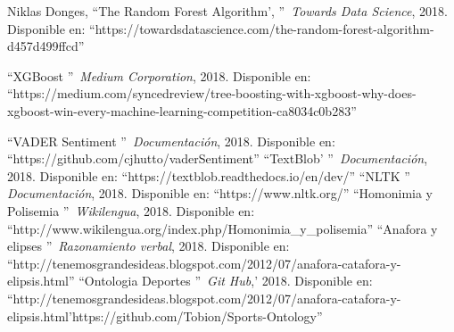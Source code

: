 \documentclass[../all.tex]{subfiles}
\begin{document}
\begin{thebibliography}{37}
			Niklas Donges, 
			\textquotedblleft The Random Forest Algorithm',
			\textquotedblright\ \textit{Towards Data Science},
			2018.
			Disponible en: ``https://towardsdatascience.com/the-random-forest-algorithm-d457d499ffcd''
		
			\textquotedblleft XGBoost
			\textquotedblright\, \textit{Medium Corporation},
			2018.
			Disponible en: ``https://medium.com/syncedreview/tree-boosting-with-xgboost-why-does-xgboost-win-every-machine-learning-competition-ca8034c0b283''
		
			\textquotedblleft VADER Sentiment
			\textquotedblright\, \textit{Documentación},
			2018.
			Disponible en: ``https://github.com/cjhutto/vaderSentiment''
			\textquotedblleft TextBlob'
			\textquotedblright\, \textit{Documentación},
			2018.
			Disponible en: ``https://textblob.readthedocs.io/en/dev/''
			\textquotedblleft NLTK
			\textquotedblright\, \textit{Documentación},
			2018.
			Disponible en: ``https://www.nltk.org/''
			\textquotedblleft Homonimia y Polisemia
			\textquotedblright\, \textit{Wikilengua},
			2018.
			Disponible en: ``http://www.wikilengua.org/index.php/Homonimia\_y\_polisemia''
			\textquotedblleft Anafora y elipses
			\textquotedblright\, \textit{Razonamiento verbal},
			2018.
			Disponible en: ``http://tenemosgrandesideas.blogspot.com/2012/07/anafora-catafora-y-elipsis.html''
			\textquotedblleft Ontologia Deportes
			\textquotedblright\ \textit{Git Hub},'
			2018.
			Disponible en: ``http://tenemosgrandesideas.blogspot.com/2012/07/anafora-catafora-y-elipsis.html'https://github.com/Tobion/Sports-Ontology''
\end{thebibliography}

%
\end{document}
